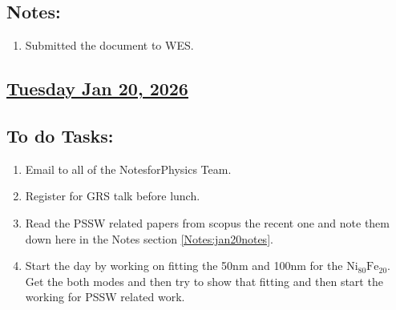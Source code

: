 \subsection*{Notes:}
\begin{enumerate}
    \item Submitted the document to WES. 
\end{enumerate}
\subsection*{\underline{Tuesday Jan 20, 2026}}
\subsection*{To do Tasks:}
\begin{enumerate}
    \item Email to all of the NotesforPhysics Team. \cmark
    \item Register for GRS talk before lunch.\cmark
    \item Read the PSSW related papers from scopus the recent one and note them down here in the Notes section \ref{Notes:jan20notes}. \cmark
    \item Start the day by working on fitting the 50nm and 100nm for the $\mathrm{Ni_{80}Fe_{20}}$. Get the both modes and then try to show that fitting and then start the working for PSSW related work. \cmark

\end{enumerate}
